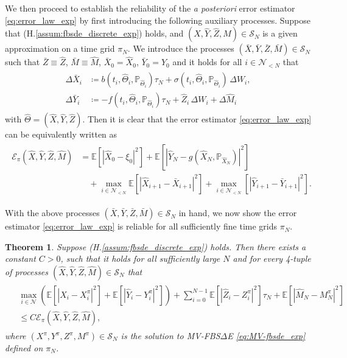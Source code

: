 \documentclass[11pt]{article}
\numberwithin{equation}{section}
\newtheorem{Theorem}{Theorem}[section]
\theoremstyle{definition}
\theoremstyle{remark}
\def\l{\label}  \def\f{\frac}  \def\fa{\forall}
\def\cE{\mathcal{E}}
\def\cN{\mathcal{N}}
\def\cS{\mathcal{S}}
\def\sE{{\mathbb{E}}}
\def\sP{\mathbb{P}}
\newcommand{\fbsde}{FBS$\Delta$E }
\begin{document}
We then proceed to  establish the reliability of the \textit{a posteriori} error estimator \eqref{eq:error_law_exp}
by first
introducing the following auxiliary processes.
Suppose that (H.\ref{assum:fbsde_discrete_exp}) holds,
and  $(\hat{X},\hat{Y},\hat{Z}, \hat{M})\in\cS_N$
is a given approximation on a time grid $\pi_N$.
We  introduce the   processes $(\bar{X},\bar{Y},\bar{Z}, \bar{M})\in\cS_N$
such that $\bar{Z}\equiv \hat{Z}$,  $\bar{M}\equiv \hat{M}$, 
$\bar{X}_0=\hat{X}_0$, $\bar{Y}_0=\hat{Y}_0$
and it holds for all $i\in \cN_{<N}$ that
\begin{align}\l{eq:Theta_bar_exp}
\begin{split}
\Delta\bar{X}_{i}
&\coloneqq
b(t_{i},\hat{\Theta}_{i},\sP_{\hat{\Theta}_{i}})\tau_N  +
\sigma (t_i,\hat{\Theta}_i,\sP_{\hat{\Theta}_i})\, \Delta W_i,
\\
\Delta \bar{Y}_{i}
&\coloneqq
-f(t_{i},\hat{\Theta}_{i}, \sP_{\hat{\Theta}_{i}})\tau_N+ \hat{Z}_i\,\Delta W_i+\Delta \hat{M}_i
\end{split}
\end{align}
with $\hat{\Theta}= (\hat{X},\hat{Y},\hat{Z})$.
Then it is clear that the error estimator \eqref{eq:error_law_exp} can be equivalently written as
\begin{align}\l{eq:error_law_Theta_bar_bwd_imp}
\begin{split}
\cE_\pi(\hat{X},\hat{Y},\hat{Z}, \hat{M})
&=
\sE[|\hat{X}_0-\xi_0|^2]
+
\sE[|\hat{Y}_N-g(\hat{X}_N,\sP_{\hat{X}_N})|^2]
\\
&\quad +
\max_{i\in \cN_{<N}}
\sE[|\hat{X}_{i+1}
-\bar{X}_{i+1}|^2]
+
\max_{i\in \cN_{<N}}
[|\hat{Y}_{i+1}-\bar{Y}_{i+1}|^2].
\end{split}
\end{align}


With the above processes $(\bar{X},\bar{Y},\bar{Z}, \bar{M})\in\cS_N$ in hand,
we now show the  error estimator \eqref{eq:error_law_exp} is  reliable for all sufficiently fine time grids $\pi_N$.


\begin{Theorem}\l{thm:error_reliable_discrete_exp}
Suppose (H.\ref{assum:fbsde_discrete_exp}) 
holds.
Then there exists a constant $C>0$,
such that
it holds for  
all 
sufficiently large $N$
and
for every 
4-tuple of processes $(\hat{X},\hat{Y},\hat{Z}, \hat{M})\in \cS_N$
that
\begin{align*}
\begin{split}
&\max_{i\in \cN}
\left(
\sE[|\hat{X}_{i}
-{X}^\pi_{i}|^2]
+
\sE[|\hat{Y}_{i}
-{Y}^\pi_{i}|^2]
\right)
+
\sum_{i=0}^{N-1}
\sE
[
|\hat{Z}_{i}
-{Z}^\pi_{i}|^2]\tau_N
+
\sE[|\hat{M}_{N}
-{M}^\pi_{N}|^2]
\\
&\le
C\cE_\pi(\hat{X},\hat{Y},\hat{Z}, \hat{M}),
\end{split}
\end{align*}
where $(X^\pi,Y^\pi, Z^\pi, M^\pi)\in \cS_N$
is the solution to MV-\fbsde \eqref{eq:MV-fbsde_exp}
defined on $\pi_N$. 

\end{Theorem}
\end{document}
